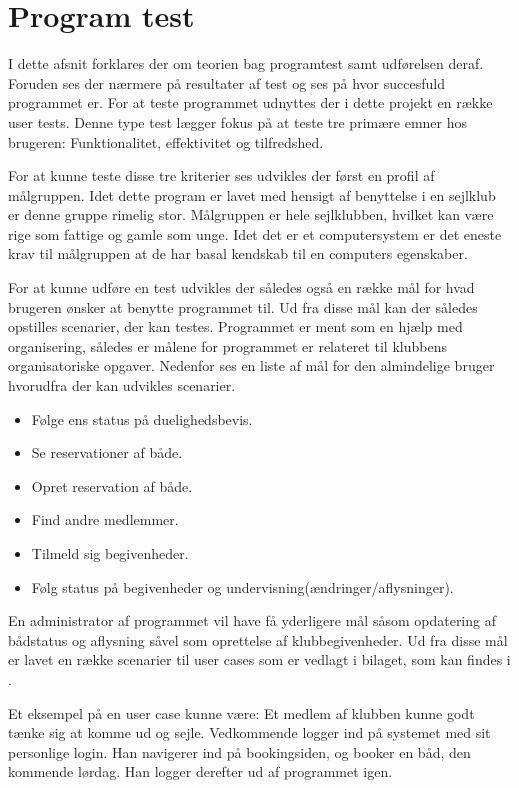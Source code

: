 \chapter{Program test}
I dette afsnit forklares der om teorien bag programtest samt udførelsen deraf. Foruden ses der nærmere på resultater af test og ses på hvor succesfuld programmet er. For at teste programmet udnyttes der i dette projekt en række user tests. Denne type test lægger fokus på at teste tre primære emner hos brugeren: Funktionalitet, effektivitet og tilfredshed. 

For at kunne teste disse tre kriterier ses udvikles der først en profil af målgruppen. Idet dette program er lavet med hensigt af benyttelse i en sejlklub er denne gruppe rimelig stor. Målgruppen er hele sejlklubben, hvilket kan være rige som fattige og gamle som unge. Idet det er et computersystem er det eneste krav til målgruppen at de har basal kendskab til en computers egenskaber.

For at kunne udføre en test udvikles der således også en række mål for hvad brugeren ønsker at benytte programmet til. Ud fra disse mål kan der således opstilles scenarier, der kan testes. Programmet er ment som en hjælp med organisering, således er målene for programmet er relateret til klubbens organisatoriske opgaver. Nedenfor ses en liste af mål for den almindelige bruger hvorudfra der kan udvikles scenarier.

\begin{itemize}
  \item Følge ens status på duelighedsbevis.
  \item Se reservationer af både.
  \item Opret reservation af både.
  \item Find andre medlemmer.
  \item Tilmeld sig begivenheder.
  \item Følg status på begivenheder og undervisning(ændringer/aflysninger).
\end{itemize}

En administrator af programmet vil have få yderligere mål såsom opdatering af bådstatus og aflysning såvel som oprettelse af klubbegivenheder. Ud fra disse mål er lavet en række scenarier til user cases som er vedlagt i bilaget, som kan findes i . 

\cbstart
Et eksempel på en user case kunne være: Et medlem af klubben kunne godt tænke sig at komme ud og sejle. Vedkommende logger ind på systemet med sit personlige login. Han navigerer ind på bookingsiden, og booker en båd, den kommende lørdag. Han logger derefter ud af programmet igen.

